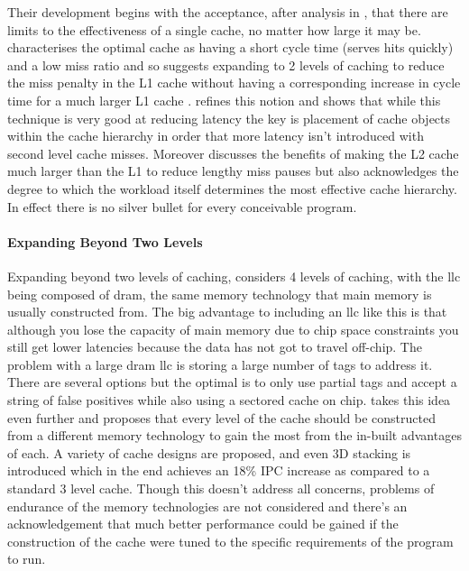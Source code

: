 Their development begins with the acceptance, after analysis in \citet{przybylskiPerformanceTradeoffsCache1988}, that there are limits to the effectiveness of a single cache, no matter how large it may be. \citet{przybylskiCharacteristicsPerformanceOptimalMultilevel1989} characterises the optimal cache as having a short cycle time (serves hits quickly) and a low miss ratio and so suggests expanding to 2 levels of caching to reduce the miss penalty in the L1 cache without having a corresponding increase in cycle time for a much larger L1 cache \cite{jouppiTradeoffsTwolevelOnchip1994}. \citet{azimiTwoLevelCache1992} refines this notion and shows that while this technique is very good at reducing latency the key is placement of cache objects within the cache hierarchy in order that more latency isn't introduced with second level cache misses. Moreover \citet{ju-hotangPerformanceDesignChoices1994} discusses the benefits of making the L2 cache much larger than the L1 to reduce lengthy miss pauses but also acknowledges the degree to which the workload itself determines the most effective cache hierarchy. In effect there is no silver bullet for every conceivable program. 

\paragraph{Expanding Beyond Two Levels}

Expanding beyond two levels of caching, \citet{zhaoExploringDRAMCache2007} considers 4 levels of caching, with the \gls{llc} being composed of \gls{dram}, the same memory technology that main memory is usually constructed from. The big advantage to including an \gls{llc} like this is that although you lose the capacity of main memory due to chip space constraints you still get lower latencies because the data has not got to travel off-chip. The problem with a large \gls{dram} \gls{llc} is storing a large number of tags to address it. There are several options but the optimal is to only use partial tags and accept a string of false positives while also using a sectored cache on chip. \citet{wuHybridCacheArchitecture2009} takes this idea even further and proposes that every level of the cache should be constructed from a different memory technology to gain the most from the in-built advantages of each. A variety of cache designs are proposed, and even 3D stacking is introduced which in the end achieves an 18\% IPC increase as compared to a standard 3 level cache. Though this doesn't address all concerns, problems of endurance of the memory technologies are not considered and there's an acknowledgement that much better performance could be gained if the construction of the cache were tuned to the specific requirements of the program to run. 

